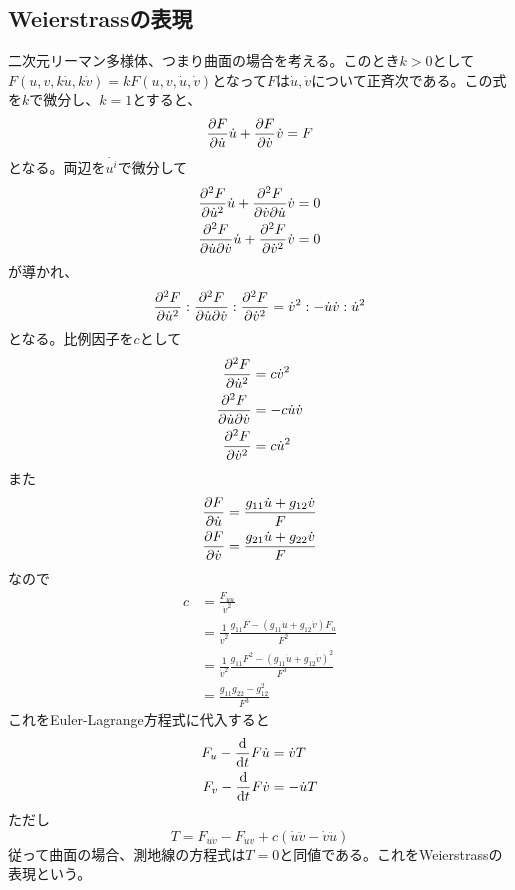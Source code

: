 \subsection{Weierstrassの表現}
    二次元リーマン多様体、つまり曲面の場合を考える。このとき$k > 0$として$F(u, v, k\dot{u}, k\dot{v}) = kF(u, v, \dot{u}, \dot{v})$となって$F$は$\dot{u}, \dot{v}$について正斉次である。この式を$k$で微分し、$k = 1$とすると、
        \[\pdv{F}{\dot{u}}\dot{u} + \pdv{F}{\dot{v}}\dot{v} = F\]
    となる。両辺を$\dot{u^i}$で微分して
    \begin{align*}
        \pdv[2]{F}{\dot{u}}\dot{u} + \pdv{F}{\dot{v}}{\dot{u}}\dot{v} &= 0\\
        \pdv{F}{\dot{u}}{\dot{v}}\dot{u} + \pdv[2]{F}{\dot{v}}\dot{v} &= 0
    \end{align*}
    が導かれ、
        \[\pdv[2]{F}{\dot{u}} : \pdv{F}{\dot{u}}{\dot{v}} : \pdv[2]{F}{\dot{v}} = \dot{v}^2 : -\dot{u}\dot{v} : \dot{u}^2\]
    となる。比例因子を$c$として
    \begin{align*}
        \pdv[2]{F}{\dot{u}} &= c\dot{v}^2\\
        \pdv{F}{\dot{u}}{\dot{v}} &= -c\dot{u}\dot{v}\\
        \pdv[2]{F}{\dot{v}} &= c\dot{u}^2
    \end{align*}
    また
    \begin{align*}
        \pdv{F}{\dot{u}} &= \frac{g_{11}\dot{u} + g_{12}\dot{v}}{F}\\
        \pdv{F}{\dot{v}} &= \frac{g_{21}\dot{u} + g_{22}\dot{v}}{F}
    \end{align*}
    なので
    \begin{align*}
        c   &= \frac{F_{\dot{u}\dot{u}}}{\dot{v}^2}\\
            &= \frac{1}{\dot{v}^2}\frac{g_{11}F - (g_{11}\dot{u} + g_{12}\dot{v})F_{\dot{u}}}{F^2}\\
            &= \frac{1}{\dot{v}^2}\frac{g_{11}F^2 - (g_{11}\dot{u} + g_{12}\dot{v})^2}{F^3}\\
            &= \frac{g_{11}g_{22} - g_{12}^2}{F^3}
    \end{align*}
    これをEuler-Lagrange方程式に代入すると
    \begin{align*}
        F_{u} - \dv{t}F{\dot{u}} &= \dot{v}T\\
        F_{v} - \dv{t}F{\dot{v}} &= -\dot{u}T
    \end{align*}
    ただし
        \[T = F_{u\dot{v}} - F_{\dot{u}v} + c(\dot{u}\ddot{v} - \dot{v}\ddot{u})\]
    従って曲面の場合、測地線の方程式は$T = 0$と同値である。これをWeierstrassの表現という。
            
